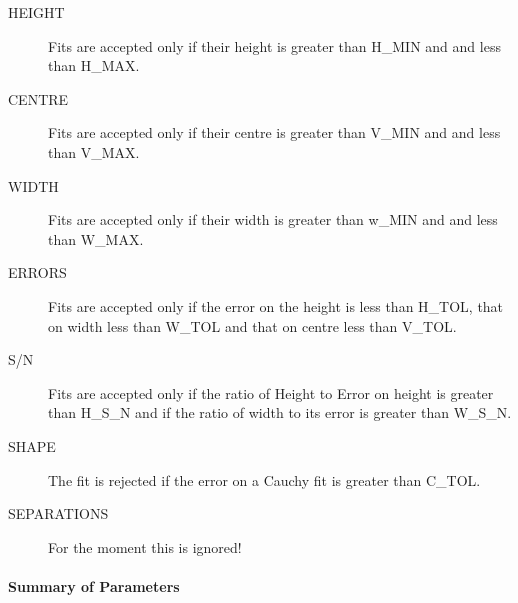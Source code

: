 \documentclass[11pt,twoside]{article}
\begin{document}
\begin{description}
\item[HEIGHT] Fits are accepted only if their height is greater than
H\_MIN and and less than H\_MAX.
\item[CENTRE] Fits are accepted only if their centre is greater than
V\_MIN and and less than V\_MAX.
\item[WIDTH] Fits are accepted only if their width is greater than
w\_MIN and and less than W\_MAX.
\item[ERRORS] Fits are accepted only if the error on the height is less
than H\_TOL, that on width less than W\_TOL and that on centre less than
V\_TOL.
\item[S/N] Fits are accepted only if the ratio of Height to Error on
height is greater than H\_S\_N and if the ratio of width to its error is
greater than W\_S\_N.
\item[SHAPE] The fit is rejected if the error on a Cauchy fit is
  greater than C\_TOL.
\item[SEPARATIONS] For the moment this is ignored!
\end{description}

\paragraph{Summary of Parameters}
\end{document}
